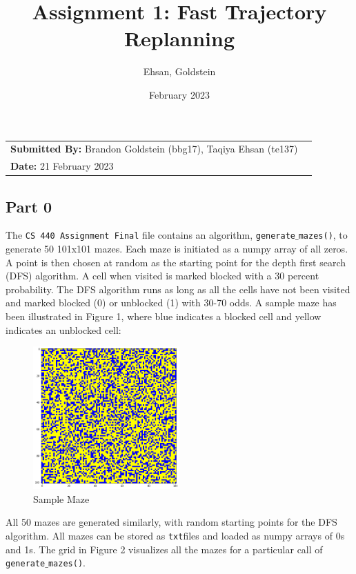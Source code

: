 \documentclass{article}
\title{\textbf{Assignment 1:} Fast Trajectory Replanning}
\author{Ehsan, Goldstein}
\date{February 2023}
\begin{document}
\maketitle

\noindent\begin{tabular}{@{}ll}
    \textbf{Submitted By: }Brandon Goldstein (bbg17), Taqiya Ehsan (te137)\\
     \textbf{Date: } 21 February 2023
\end{tabular}

\subsection*{Part 0}
The \texttt{CS 440 Assignment Final} file contains an algorithm, \texttt{generate\(\_\)mazes()}, to generate 50 101x101 mazes. Each maze is initiated as a numpy array of all zeros. A  point is then chosen at random as the starting point for the depth first search (DFS) algorithm. A cell when visited is marked blocked with a 30 percent probability. The DFS algorithm runs as long as all the cells have not been visited and marked blocked (0) or unblocked (1) with 30-70 odds. A sample maze has been illustrated in Figure 1, where blue indicates a blocked cell and yellow indicates an unblocked cell:

\begin{figure}[!htbp]
\centering
\includegraphics[width=0.5\textwidth, height=0.5\textheight,keepaspectratio]{maze_big.png}
\caption{Sample Maze}
    \label{fig:Map}
\end{figure}

\noindent
All 50 mazes are generated similarly, with random starting points for the DFS algorithm. All mazes can be stored as \texttt{txt}files and loaded as numpy arrays of 0s and 1s. The grid in Figure 2 visualizes all the mazes for a particular call of \texttt{generate\(\_\)mazes()}.\\
\end{document}
